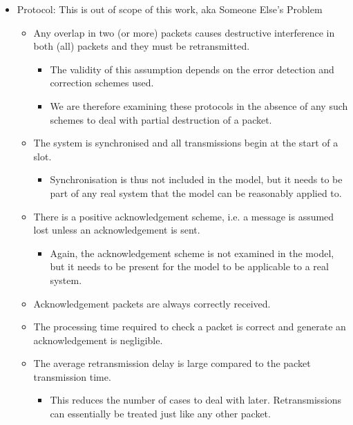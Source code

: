 \begin{itemize}[noitemsep]
\item Protocol: This is out of scope of this work, aka Someone Else’s Problem
  \begin{itemize}[noitemsep]
  \item Any overlap in two (or more) packets causes destructive interference in both (all) packets and they must be retransmitted.
    \begin{itemize}[noitemsep]
    \item The validity of this assumption depends on the error detection and correction schemes used.
    \item We are therefore examining these protocols in the absence of any such schemes to deal with partial destruction of a packet.
    \end{itemize}
  \item The system is synchronised and all transmissions begin at the
    start of a slot.
    \begin{itemize}[noitemsep]
    \item Synchronisation is thus not included in the model, but it
      needs to be part of any real system that the model can be reasonably
      applied to.
    \end{itemize}
  \item There is a positive acknowledgement scheme, i.e. a message is assumed lost unless an acknowledgement is sent.
    \begin{itemize}[noitemsep]
    \item Again, the acknowledgement scheme is not examined in the model, but it needs to be present for the model to be applicable to a real system.
    \end{itemize}

  \item Acknowledgement packets are always correctly received.
  \item The processing time required to check a packet is correct and generate an acknowledgement is negligible.
  \item The average retransmission delay is large compared to the packet transmission time.
    \begin{itemize}[noitemsep]
    \item This reduces the number of cases to deal with later. Retransmissions can essentially be treated just like any other packet.
    \end{itemize}
  \end{itemize}


\end{itemize}
